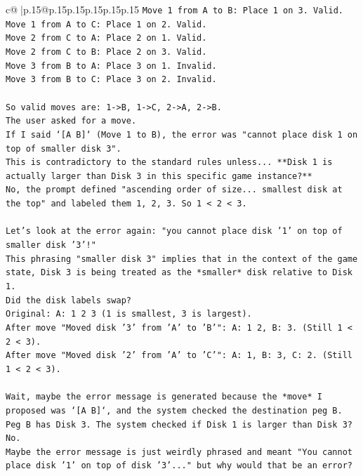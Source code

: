 \documentclass{article}
\begin{document}
{\begin{supertabular}{c@{$\;$}|p{.15\linewidth}@{}p{.15\linewidth}p{.15\linewidth}p{.15\linewidth}p{.15\linewidth}p{.15\linewidth}}
{{{\texttt{Move 1 from A to B: Place 1 on 3. Valid.} \\
\texttt{Move 1 from A to C: Place 1 on 2. Valid.} \\
\texttt{Move 2 from C to A: Place 2 on 1. Valid.} \\
\texttt{Move 2 from C to B: Place 2 on 3. Valid.} \\
\texttt{Move 3 from B to A: Place 3 on 1. Invalid.} \\
\texttt{Move 3 from B to C: Place 3 on 2. Invalid.} \\
\\ 
\texttt{So valid moves are: 1{-}>B, 1{-}>C, 2{-}>A, 2{-}>B.} \\
\texttt{The user asked for a move.} \\
\texttt{If I said `{[}A B{]}` (Move 1 to B), the error was "cannot place disk 1 on top of smaller disk 3".} \\
\texttt{This is contradictory to the standard rules unless... **Disk 1 is actually larger than Disk 3 in this specific game instance?**} \\
\texttt{No, the prompt defined "ascending order of size... smallest disk at the top" and labeled them 1, 2, 3. So 1 < 2 < 3.} \\
\\ 
\texttt{Let's look at the error again: "you cannot place disk '1' on top of smaller disk '3'!"} \\
\texttt{This phrasing "smaller disk 3" implies that in the context of the game state, Disk 3 is being treated as the *smaller* disk relative to Disk 1.} \\
\texttt{Did the disk labels swap?} \\
\texttt{Original: A: 1 2 3 (1 is smallest, 3 is largest).} \\
\texttt{After move "Moved disk '3' from 'A' to 'B'": A: 1 2, B: 3. (Still 1 < 2 < 3).} \\
\texttt{After move "Moved disk '2' from 'A' to 'C'": A: 1, B: 3, C: 2. (Still 1 < 2 < 3).} \\
\\ 
\texttt{Wait, maybe the error message is generated because the *move* I proposed was `{[}A B{]}`, and the system checked the destination peg B. Peg B has Disk 3. The system checked if Disk 1 is larger than Disk 3? No.} \\
\texttt{Maybe the error message is just weirdly phrased and meant "You cannot place disk '1' on top of disk '3'..." but why would that be an error?} \\
}}}
\end{supertabular}}
\end{document}
